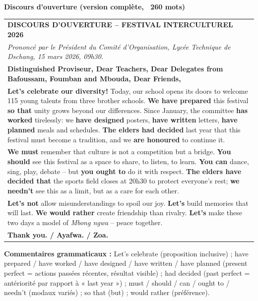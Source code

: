 \documentclass[11pt]{article}
\newcommand{\cle}[1]{{\popxbold\color{popdark}#1}}
\begin{document}
\begin{corrige}
\textbf{Discours d'ouverture (version complète, ~260 mots)}

\begin{center}
\begin{tabularx}{\linewidth}{|X|}\hline
\textbf{DISCOURS D'OUVERTURE -- FESTIVAL INTERCULTUREL 2026} \\
\textit{Prononcé par le Président du Comité d'Organisation, Lycée Technique de Dschang, 15 mars 2026, 09h30.} \\ \hline
\textbf{Distinguished Proviseur, Dear Teachers, Dear Delegates from Bafoussam, Foumban and Mbouda, Dear Friends,} \\
\textbf{Let's celebrate our diversity!} Today, our school opens its doors to welcome 115 young talents from three brother schools. \textbf{We have prepared} this festival \textbf{so that} unity grows beyond our differences. Since January, the committee \textbf{has worked} tirelessly: we \textbf{have designed} posters, \textbf{have written} letters, \textbf{have planned} meals and schedules. \textbf{The elders had decided} last year that this festival must become a tradition, and we \textbf{are honoured} to continue it. \\
\textbf{We must} remember that culture is not a competition but a bridge. \textbf{You should} see this festival as a space to share, to listen, to learn. \textbf{You can} dance, sing, play, debate -- but \textbf{you ought to} do it with respect. \textbf{The elders have decided that} the sports field closes at 20h30 to protect everyone's rest; \textbf{we needn't} see this as a limit, but as a care for each other. \\
\textbf{Let's not} allow misunderstandings to spoil our joy. \textbf{Let's} build memories that will last. \textbf{We would rather} create friendship than rivalry. \textbf{Let's} make these two days a model of \emph{Mbong ngwa} -- peace together. \\
\textbf{Thank you. / Ayafwa. / Zoa.} \\ \hline
\end{tabularx}
\end{center}

\textbf{Commentaires grammaticaux :} \cle{Let's celebrate} (proposition inclusive) ; \cle{have prepared / have worked / have designed / have written / have planned} (present perfect = actions passées récentes, résultat visible) ; \cle{had decided} (past perfect = antériorité par rapport à « last year ») ; \cle{must / should / can / ought to / needn't} (modaux variés) ; \cle{so that} (but) ; \cle{would rather} (préférence).
\end{corrige}
\end{document}

